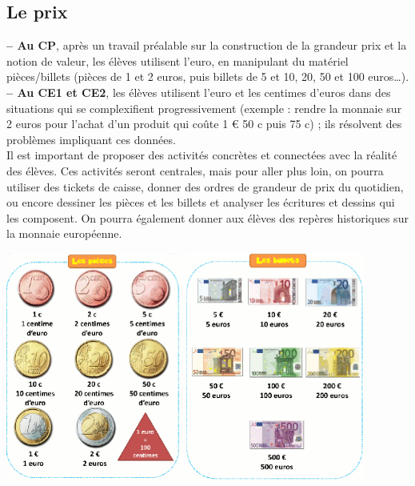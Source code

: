 {\pagebreak


\subsection{Le prix} %

{\bf -- Au CP}, après un travail préalable sur la construction de la grandeur prix et la notion de valeur, les élèves utilisent l’euro, en manipulant du matériel pièces/billets (pièces de 1 et 2 euros, puis billets de 5 et 10, 20, 50 et 100 euros\dots). \\
{\bf -- Au CE1 et CE2}, les élèves utilisent l’euro et les centimes d’euros dans des situations qui se complexifient progressivement (exemple : rendre la monnaie sur 2 euros pour l’achat d’un produit qui coûte 1 \euro{} 50 c puis 75 c) ; ils résolvent des problèmes impliquant ces données. \\
Il est important de proposer des activités concrètes et connectées avec la réalité des élèves. Ces activités seront centrales, mais pour aller plus loin, on pourra utiliser des tickets de caisse, donner des ordres de grandeur de prix du quotidien, ou encore dessiner les pièces et les billets et analyser les écritures et dessins qui les composent. On pourra également  donner aux élèves des repères historiques sur la monnaie européenne.
\begin{center}
   \includegraphics[height=7.5cm]{Grandeurs_mesures_did/Images/Grm7_cours_pieces}
   \includegraphics[height=7.5cm]{Grandeurs_mesures_did/Images/Grm7_cours_billets}
\end{center}

}
